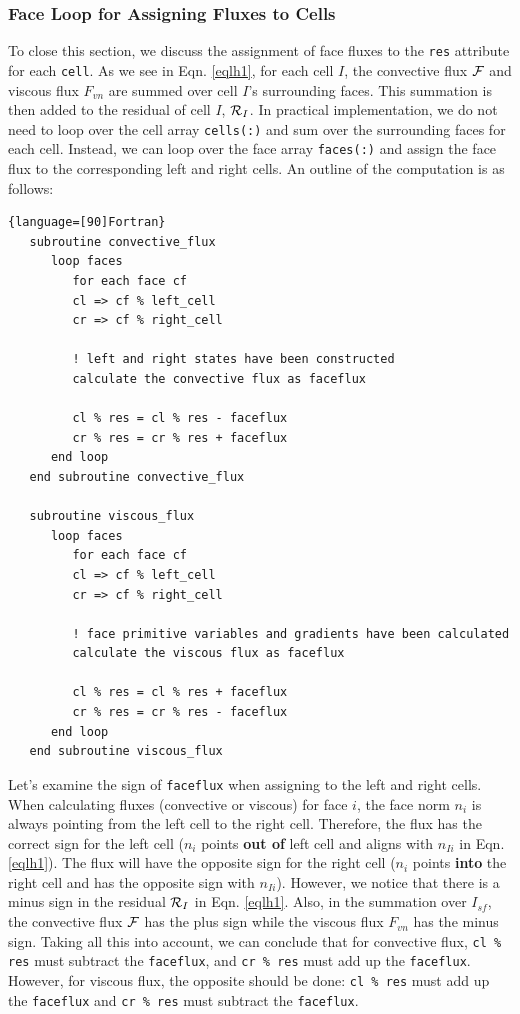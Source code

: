 \documentclass[12pt, letterpaper]{report}
\begin{document}
\subsubsection{Face Loop for Assigning Fluxes to Cells}

To close this section, we discuss the assignment of face fluxes to the \verb+res+ attribute for each
\verb+cell+. As we see in Eqn. \ref{eqlh1}, for each cell $I$, the convective flux $\mathcal{F}$ and viscous
flux $F_{vn}$ are summed over cell $I$'s surrounding faces. This summation is then added to the
residual of cell $I$, $\mathcal{R}_I$. In practical implementation, we do not need to loop over the cell
array \verb+cells(:)+ and sum over the surrounding faces for each cell. Instead, we can loop over the
face array \verb+faces(:)+ and assign the face flux to the corresponding left and right cells. An
outline of the computation is as follows:


\begin{lstlisting}{language=[90]Fortran}
   subroutine convective_flux
      loop faces
         for each face cf
         cl => cf % left_cell
         cr => cf % right_cell

         ! left and right states have been constructed
         calculate the convective flux as faceflux

         cl % res = cl % res - faceflux 
         cr % res = cr % res + faceflux
      end loop
   end subroutine convective_flux

   subroutine viscous_flux
      loop faces
         for each face cf
         cl => cf % left_cell
         cr => cf % right_cell

         ! face primitive variables and gradients have been calculated
         calculate the viscous flux as faceflux

         cl % res = cl % res + faceflux 
         cr % res = cr % res - faceflux
      end loop
   end subroutine viscous_flux
\end{lstlisting}

Let's examine the sign of \verb+faceflux+ when assigning to the left and right cells. When
calculating fluxes (convective or viscous) for face $i$, the face norm $n_i$ is always pointing from
the left cell to the right cell. Therefore, the flux has the correct sign for the left cell ($n_i$
points {\bf out of} left cell and aligns with $n_{Ii}$ in Eqn. \ref{eqlh1}).  The flux will have the
opposite sign for the right cell ($n_i$ points {\bf into} the right cell and has the opposite sign
with $n_{Ii}$). However, we notice that there is a minus sign in the residual $\mathcal{R}_I$ in Eqn.
\ref{eqlh1}. Also, in the summation over $I_{sf}$, the convective flux $\mathcal{F}$ has the plus sign while
the viscous flux $F_{vn}$ has the minus sign. Taking all this into account, we can conclude that for
convective flux, \verb+cl % res+ must subtract the \verb+faceflux+, and \verb+cr % res+ must add up
the \verb+faceflux+. However, for viscous flux, the opposite should be done: \verb+cl % res+ must
add up the \verb+faceflux+ and \verb+cr % res+ must subtract the \verb+faceflux+.
\paraspace
\end{document}
